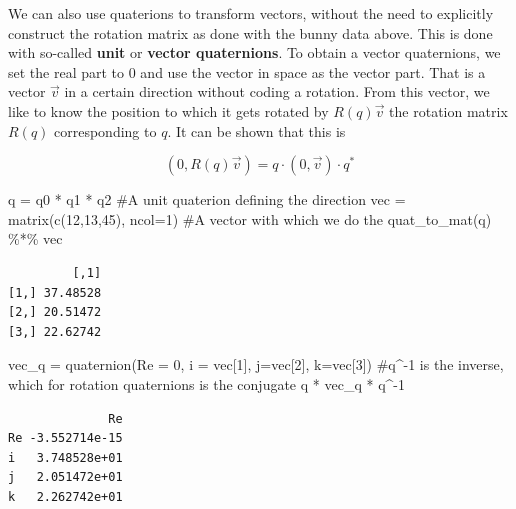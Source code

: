 \documentclass[
  letterpaper,
  DIV=11,
  numbers=noendperiod]{scrartcl}
\newenvironment{Shaded}{\begin{snugshade}}{\end{snugshade}}
\newcommand{\AttributeTok}[1]{\textcolor[rgb]{0.40,0.45,0.13}{#1}}
\newcommand{\CommentTok}[1]{\textcolor[rgb]{0.37,0.37,0.37}{#1}}
\newcommand{\DecValTok}[1]{\textcolor[rgb]{0.68,0.00,0.00}{#1}}
\newcommand{\FunctionTok}[1]{\textcolor[rgb]{0.28,0.35,0.67}{#1}}
\newcommand{\NormalTok}[1]{\textcolor[rgb]{0.00,0.23,0.31}{#1}}
\newcommand{\OtherTok}[1]{\textcolor[rgb]{0.00,0.23,0.31}{#1}}
\newcommand{\SpecialCharTok}[1]{\textcolor[rgb]{0.37,0.37,0.37}{#1}}
\begin{document}
We can also use quaterions to transform vectors, without the need to
explicitly construct the rotation matrix as done with the bunny data
above. This is done with so-called \textbf{unit} or \textbf{vector
quaternions}. To obtain a vector quaternions, we set the real part to 0
and use the vector in space as the vector part. That is a vector
\(\vec{v}\) in a certain direction without coding a rotation. From this
vector, we like to know the position to which it gets rotated by
\(R(q) \vec{v}\) the rotation matrix \(R(q)\) corresponding to \(q\). It
can be shown that this is

\[
  (0, R(q) \vec{v}) = q \cdot (0,\vec{v}) \cdot q^{*} 
\]

\begin{Shaded}
\begin{Highlighting}[]
\NormalTok{ q }\OtherTok{=}\NormalTok{ q0 }\SpecialCharTok{*}\NormalTok{ q1 }\SpecialCharTok{*}\NormalTok{ q2 }\CommentTok{\#A unit quaterion defining the direction}
\NormalTok{ vec }\OtherTok{=} \FunctionTok{matrix}\NormalTok{(}\FunctionTok{c}\NormalTok{(}\DecValTok{12}\NormalTok{,}\DecValTok{13}\NormalTok{,}\DecValTok{45}\NormalTok{), }\AttributeTok{ncol=}\DecValTok{1}\NormalTok{) }\CommentTok{\#A vector with which we do the }
 \FunctionTok{quat\_to\_mat}\NormalTok{(q) }\SpecialCharTok{\%*\%}\NormalTok{ vec}
\end{Highlighting}
\end{Shaded}

\begin{verbatim}
         [,1]
[1,] 37.48528
[2,] 20.51472
[3,] 22.62742
\end{verbatim}

\begin{Shaded}
\begin{Highlighting}[]
\NormalTok{ vec\_q }\OtherTok{=} \FunctionTok{quaternion}\NormalTok{(}\AttributeTok{Re =} \DecValTok{0}\NormalTok{, }\AttributeTok{i =}\NormalTok{ vec[}\DecValTok{1}\NormalTok{], }\AttributeTok{j=}\NormalTok{vec[}\DecValTok{2}\NormalTok{], }\AttributeTok{k=}\NormalTok{vec[}\DecValTok{3}\NormalTok{])}
 \CommentTok{\#q\^{}{-}1 is the inverse, which for rotation quaternions is the conjugate }
\NormalTok{ q }\SpecialCharTok{*}\NormalTok{ vec\_q }\SpecialCharTok{*}\NormalTok{ q}\SpecialCharTok{\^{}{-}}\DecValTok{1}
\end{Highlighting}
\end{Shaded}

\begin{verbatim}
              Re
Re -3.552714e-15
i   3.748528e+01
j   2.051472e+01
k   2.262742e+01
\end{verbatim}
\end{document}
